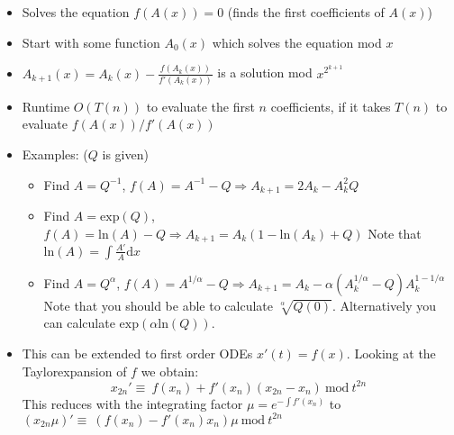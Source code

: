 \begin{itemize}
	\item Solves the equation $f(A(x)) = 0$ (finds the first coefficients of $A(x)$)
  \item Start with some function $A_0(x)$ which solves the equation mod $x$
  \item $A_{k+1}(x) = A_{k}(x) - \frac{f(A_{k}(x))}{f'(A_{k}(x))}$ is a solution mod $x^{2^{k+1}}$
	\item Runtime $O\left(T(n)\right)$ to evaluate the first $n$ coefficients, if it takes $T(n)$ to evaluate $f(A(x)) / f'(A(x))$
  \item Examples: ($Q$ is given)
  \begin{itemize}
    \item Find $A = Q^{-1}$, $f(A) = A^{-1} - Q \Rightarrow A_{k+1} = 2A_{k} - A_{k}^2Q$
    \item Find $A = \mathrm{exp}(Q)$, $f(A) = \mathrm{ln}(A) - Q \Rightarrow A_{k+1} = A_{k}(1 - \mathrm{ln}(A_k) + Q)$ Note that $\mathrm{ln}(A) = \int\frac{A'}{A}\mathrm{d}x$
    \item Find $A = Q^\alpha$, $f(A) = A^{1/\alpha} - Q \Rightarrow A_{k+1} = A_{k} - \alpha (A_{k}^{1/\alpha} - Q) A_{k}^{1 - 1/\alpha}$ Note that you should be able to calculate $\sqrt[\alpha]{Q(0)}$. Alternatively you can calculate $\mathrm{exp}(\alpha\mathrm{ln}(Q))$.
  \end{itemize}

  \item This can be extended to first order ODEs $x'(t) = f(x)$. Looking at the Taylorexpansion of $f$ we obtain: $$x_{2n}' \equiv\ f(x_n) + f'(x_n)(x_{2n}-x_n)\ \mathrm{mod}\ t^{2n}$$ This reduces with the integrating factor $\mu = e^{-\int f'(x_n)}$ to $(x_{2n}\mu)' \equiv\ (f(x_n) - f'(x_n) x_n) \mu\ \mathrm{mod}\ t^{2n}$
\end{itemize}